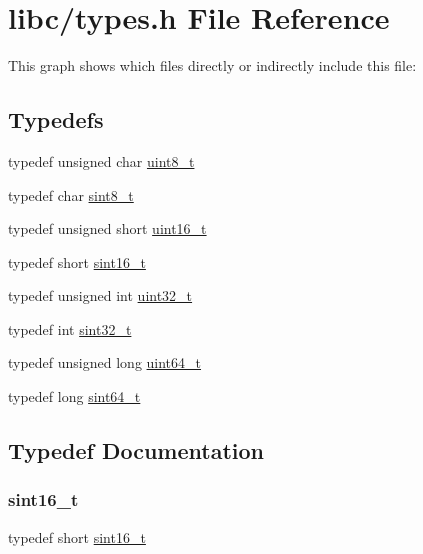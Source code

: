 \hypertarget{a00017}{}\section{libc/types.h File Reference}
\label{a00017}
This graph shows which files directly or indirectly include this file\+:
\subsection*{Typedefs}
\begin{DoxyCompactItemize}
\item 
typedef unsigned char \hyperlink{a00017_aba7bc1797add20fe3efdf37ced1182c5_aba7bc1797add20fe3efdf37ced1182c5}{uint8\+\_\+t}
\item 
typedef char \hyperlink{a00017_afa23178c4119f09bd4562a86b501f444_afa23178c4119f09bd4562a86b501f444}{sint8\+\_\+t}
\item 
typedef unsigned short \hyperlink{a00017_a273cf69d639a59973b6019625df33e30_a273cf69d639a59973b6019625df33e30}{uint16\+\_\+t}
\item 
typedef short \hyperlink{a00017_a5881659ed80e940350d12831204375cd_a5881659ed80e940350d12831204375cd}{sint16\+\_\+t}
\item 
typedef unsigned int \hyperlink{a00017_a435d1572bf3f880d55459d9805097f62_a435d1572bf3f880d55459d9805097f62}{uint32\+\_\+t}
\item 
typedef int \hyperlink{a00017_ad838970452fe561cb8e0550cac5336be_ad838970452fe561cb8e0550cac5336be}{sint32\+\_\+t}
\item 
typedef unsigned long \hyperlink{a00017_aa232ecf786a74ce5363c36c10798d2b1_aa232ecf786a74ce5363c36c10798d2b1}{uint64\+\_\+t}
\item 
typedef long \hyperlink{a00017_a04761b9e7480e1e48b0d392da17fd5d4_a04761b9e7480e1e48b0d392da17fd5d4}{sint64\+\_\+t}
\end{DoxyCompactItemize}


\subsection{Typedef Documentation}
\mbox{\label{a00017_a5881659ed80e940350d12831204375cd_a5881659ed80e940350d12831204375cd}} 
\subsubsection{\texorpdfstring{sint16\+\_\+t}{sint16\_t}}
{\footnotesize\ttfamily typedef short \hyperlink{a00017_a5881659ed80e940350d12831204375cd_a5881659ed80e940350d12831204375cd}{sint16\+\_\+t}}



